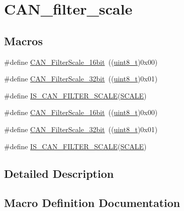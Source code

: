 \hypertarget{group___c_a_n__filter__scale}{}\section{C\+A\+N\+\_\+filter\+\_\+scale}
\label{group___c_a_n__filter__scale}
\subsection*{Macros}
\begin{DoxyCompactItemize}
\item 
\#define \hyperlink{group___c_a_n__filter__scale_ga9e0493937e73bcf9a4127eef2f255a95}{C\+A\+N\+\_\+\+Filter\+Scale\+\_\+16bit}~((\hyperlink{_p_e___types_8h_aba7bc1797add20fe3efdf37ced1182c5}{uint8\+\_\+t})0x00)
\item 
\#define \hyperlink{group___c_a_n__filter__scale_gac63dfb0e11713c59268ee9f4aebab60e}{C\+A\+N\+\_\+\+Filter\+Scale\+\_\+32bit}~((\hyperlink{_p_e___types_8h_aba7bc1797add20fe3efdf37ced1182c5}{uint8\+\_\+t})0x01)
\item 
\#define \hyperlink{group___c_a_n__filter__scale_gaf64c93166af0eb5ec7e804116f10783a}{I\+S\+\_\+\+C\+A\+N\+\_\+\+F\+I\+L\+T\+E\+R\+\_\+\+S\+C\+A\+LE}(\hyperlink{imu__loop_8c_a0cbea62f1ce2043dd08108e65ed8de1d}{S\+C\+A\+LE})
\item 
\#define \hyperlink{group___c_a_n__filter__scale_ga9e0493937e73bcf9a4127eef2f255a95}{C\+A\+N\+\_\+\+Filter\+Scale\+\_\+16bit}~((\hyperlink{_p_e___types_8h_aba7bc1797add20fe3efdf37ced1182c5}{uint8\+\_\+t})0x00)
\item 
\#define \hyperlink{group___c_a_n__filter__scale_gac63dfb0e11713c59268ee9f4aebab60e}{C\+A\+N\+\_\+\+Filter\+Scale\+\_\+32bit}~((\hyperlink{_p_e___types_8h_aba7bc1797add20fe3efdf37ced1182c5}{uint8\+\_\+t})0x01)
\item 
\#define \hyperlink{group___c_a_n__filter__scale_gaf64c93166af0eb5ec7e804116f10783a}{I\+S\+\_\+\+C\+A\+N\+\_\+\+F\+I\+L\+T\+E\+R\+\_\+\+S\+C\+A\+LE}(\hyperlink{imu__loop_8c_a0cbea62f1ce2043dd08108e65ed8de1d}{S\+C\+A\+LE})
\end{DoxyCompactItemize}


\subsection{Detailed Description}


\subsection{Macro Definition Documentation}
